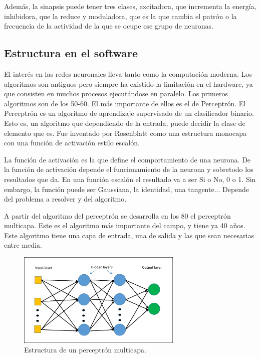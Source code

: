 \documentclass[12pt]{book}
\numberwithin{equation}{section}
\begin{document}
Además, la sinapsis puede tener tres clases, excitadora, que incrementa la energía, 	inhibidora, que la reduce y moduladora, que es la que cambia el patrón o la frecuencia de la actividad de la que se ocupe ese grupo de neuronas. 

\subsection{Estructura en el software}

El interés en las redes neuronales lleva tanto como la computación moderna. Los algoritmos son antiguos pero siempre ha existido la limitación en el hardware, ya que consisten en muchos procesos ejecutándose en paralelo. Los primeros algoritmos son de los 50-60. El más importante de ellos es el de Perceptrón. El Perceptrón es un algoritmo de aprendizaje supervisado de un clasificador binario. Esto es, un algoritmo que dependiendo de la entrada, puede decidir la clase de elemento que es. Fue inventado por Rosenblatt como una estructura monocapa con una función de activación estilo escalón.

La función de activación es la que define el comportamiento de una neurona. De la función de activación depende el funcionamiento de la neurona y sobretodo los resultados que da. En una función escalón el resultado va a ser Si o No, 0 o 1. Sin embargo, la función puede ser Gaussiana, la identidad, una tangente... Depende del problema a resolver y del algoritmo.

A partir del algoritmo del perceptrón se desarrolla en los 80 el perceptrón multicapa. Este es el algoritmo más importante del campo, y tiene ya 40 años. Este algoritmo tiene una capa de entrada, una de salida y las que sean necesarias entre media.

\begin{figure}[h]
    \centering
    \includegraphics[width=0.7\textwidth]{multicapa.jpg}
    \caption{Estructura de un perceptrón multicapa.}
    \label{fig:estructuraneurona}
\end{figure}
\end{document}
